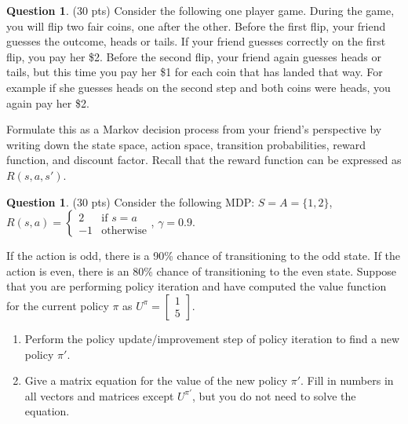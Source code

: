 \documentclass{article}
\theoremstyle{definition}
\newtheorem{question}[thm]{Question}
\begin{document}
\begin{question} (30 pts)
    Consider the following one player game. During the game, you will flip two fair coins, one after the other. Before the first flip, your friend guesses the outcome, heads or tails. If your friend guesses correctly on the first flip, you pay her \$2. Before the second flip, your friend again guesses heads or tails, but this time you pay her \$1 for each coin that has landed that way. For example if she guesses heads on the second step and both coins were heads, you again pay her \$2.

    Formulate this as a Markov decision process from your friend's perspective by writing down the state space, action space, transition probabilities, reward function, and discount factor. Recall that the reward function can be expressed as $R(s, a, s')$.
\end{question}



\clearpage

\begin{question} (30 pts)
    Consider the following MDP: $S = A = \{1,2\}$, $R(s, a) = \begin{cases}
            2 & \text{if } s = a\\
            -1 & \text{otherwise}
        \end{cases}$, $\gamma = 0.9$.

        If the action is odd, there is a 90\% chance of transitioning to the odd state. If the action is even, there is an 80\% chance of transitioning to the even state. Suppose that you are performing policy iteration and have computed the value function for the current policy $\pi$ as $U^\pi = \begin{bmatrix}
            1 \\
            5
            \end{bmatrix}$.
    \begin{enumerate}[label=\alph*)]
        \item Perform the policy update/improvement step of policy iteration to find a new policy $\pi'$.
        \item Give a matrix equation for the value of the new policy $\pi'$. Fill in numbers in all vectors and matrices except $U^{\pi'}$, but you do not need to solve the equation.
    \end{enumerate}
\end{question}
\end{document}
